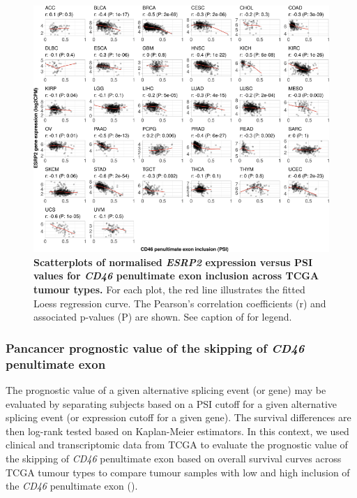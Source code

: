 \begin{figure}[!h]
  \includegraphics[width=1\textwidth]{images/psichomics/10-tcga-esrp2}
  \centering
  \caption[\emph{ESRP2} expression versus \emph{CD46} penultimate exon PSI in TCGA]{\textbf{Scatterplots of normalised \emph{ESRP2} expression versus PSI values for \emph{CD46} penultimate exon inclusion across TCGA tumour types.} For each plot, the red line illustrates the fitted Loess regression curve. The Pearson’s correlation coefficients (r) and associated p-values (P) are shown. See caption of  for legend.}
  \label{fig:psichomics-tcga-esrp2}
\end{figure}

\subsubsection{Pancancer prognostic value of the skipping of \emph{CD46} penultimate exon}

The prognostic value of a given alternative splicing event (or gene) may be evaluated by separating subjects based on a PSI cutoff for a given alternative splicing event (or expression cutoff for a given gene). The survival differences are then log-rank tested based on Kaplan-Meier estimators. In this context, we used clinical and transcriptomic data from TCGA to evaluate the prognostic value of the skipping of \emph{CD46} penultimate exon based on overall survival curves across TCGA tumour types to compare tumour samples with low and high inclusion of the \emph{CD46} penultimate exon ().

